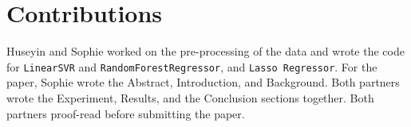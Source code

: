 
\section{Contributions}
\label{sec:contrib}

Huseyin and Sophie worked on the pre-processing of the data and wrote the code for \texttt{LinearSVR} and \texttt{RandomForestRegressor}, and \texttt{Lasso Regressor}. For the paper, Sophie wrote the Abstract, Introduction, and Background. Both partners wrote the Experiment, Results, and the Conclusion sections together. Both partners proof-read before submitting the paper. 

